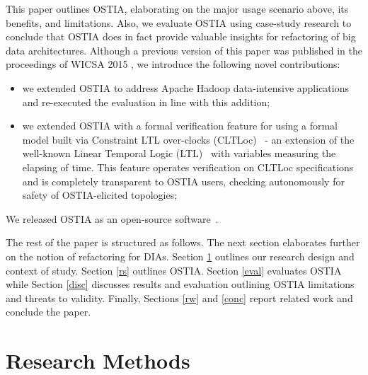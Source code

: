 \documentclass[smallextended]{svjour3}       %
\newcommand{\todoMB}[2]{\linespread{0.7}\todo[color=yellow!50,#1]{\scriptsize\textbf{MB:}#2}}
\begin{document}
This paper outlines OSTIA, elaborating on the major usage scenario above, its benefits, and limitations. Also, we evaluate OSTIA using case-study research to conclude that OSTIA does in fact provide valuable insights for refactoring of big data architectures.
Although a previous version of this paper was published in the proceedings of WICSA 2015 \cite{wicsabd}, we introduce the following novel contributions:
\begin{itemize}
\item we extended OSTIA to address Apache Hadoop data-intensive applications and re-executed the evaluation in line with this addition;
\item we extended OSTIA with a formal verification feature for using a formal model built via Constraint LTL over-clocks (CLTLoc)~\cite{BRS15} - an extension of the well-known Linear Temporal Logic (LTL)~\cite{ltl} with variables measuring the elapsing of time. This feature operates verification on CLTLoc specifications and is completely transparent to OSTIA users, checking autonomously for  safety of OSTIA-elicited topologies;
\end{itemize}

We released OSTIA as an open-source software~\cite{ostia}.

The rest of the paper is structured as follows. The next section elaborates further on the notion of refactoring for DIAs. Section \ref{ra} outlines our research design and context of study. Section \ref{rs} outlines OSTIA. Section \ref{eval} evaluates OSTIA while Section \ref{disc} discusses results and evaluation outlining OSTIA limitations and threats to validity. Finally, Sections \ref{rw} and \ref{conc} report related work and conclude the paper.



\section{Research Methods}

\label{ra}
%
\end{document}
